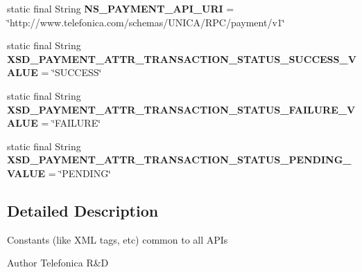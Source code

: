 \begin{DoxyCompactItemize}
\item 
\hypertarget{classcom_1_1bluevia_1_1commons_1_1parser_1_1xml_1_1XmlConstants_af8073bdbea604b12523cb058c95f3ed2}{
static final String {\bfseries NS\_\-PAYMENT\_\-API\_\-URI} = \char`\"{}http://www.telefonica.com/schemas/UNICA/RPC/payment/v1\char`\"{}}
\label{classcom_1_1bluevia_1_1commons_1_1parser_1_1xml_1_1XmlConstants_af8073bdbea604b12523cb058c95f3ed2}

\item 
\hypertarget{classcom_1_1bluevia_1_1commons_1_1parser_1_1xml_1_1XmlConstants_afa6736704ac0df52a327a125d0fe53f1}{
static final String {\bfseries XSD\_\-PAYMENT\_\-ATTR\_\-TRANSACTION\_\-STATUS\_\-SUCCESS\_\-VALUE} = \char`\"{}SUCCESS\char`\"{}}
\label{classcom_1_1bluevia_1_1commons_1_1parser_1_1xml_1_1XmlConstants_afa6736704ac0df52a327a125d0fe53f1}

\item 
\hypertarget{classcom_1_1bluevia_1_1commons_1_1parser_1_1xml_1_1XmlConstants_a3bd71c5b7b3127a7b4270315786b2b59}{
static final String {\bfseries XSD\_\-PAYMENT\_\-ATTR\_\-TRANSACTION\_\-STATUS\_\-FAILURE\_\-VALUE} = \char`\"{}FAILURE\char`\"{}}
\label{classcom_1_1bluevia_1_1commons_1_1parser_1_1xml_1_1XmlConstants_a3bd71c5b7b3127a7b4270315786b2b59}

\item 
\hypertarget{classcom_1_1bluevia_1_1commons_1_1parser_1_1xml_1_1XmlConstants_a0b3f8c5a33f924340cda9a41d97c028a}{
static final String {\bfseries XSD\_\-PAYMENT\_\-ATTR\_\-TRANSACTION\_\-STATUS\_\-PENDING\_\-VALUE} = \char`\"{}PENDING\char`\"{}}
\label{classcom_1_1bluevia_1_1commons_1_1parser_1_1xml_1_1XmlConstants_a0b3f8c5a33f924340cda9a41d97c028a}

\end{DoxyCompactItemize}


\subsection{Detailed Description}
Constants (like XML tags, etc) common to all APIs \begin{DoxyAuthor}{Author}
Telefonica R\&D 
\end{DoxyAuthor}
